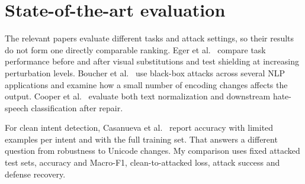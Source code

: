 \section{State-of-the-art evaluation}
\label{sec:literature-evaluation}
The relevant papers evaluate different tasks and attack settings, so their results do not form one directly comparable ranking. Eger et al.~\cite{eger2019visual} compare task performance before and after visual substitutions and test shielding at increasing perturbation levels. Boucher et al.~\cite{boucher2022bad} use black-box attacks across several NLP applications and examine how a small number of encoding changes affects the output. Cooper et al.~\cite{cooper2025lies} evaluate both text normalization and downstream hate-speech classification after repair.

For clean intent detection, Casanueva et al.~\cite{casanueva2020banking77} report accuracy with limited examples per intent and with the full training set. That answers a different question from robustness to Unicode changes. My comparison uses fixed attacked test sets, accuracy and Macro-F1, clean-to-attacked loss, attack success and defense recovery.
